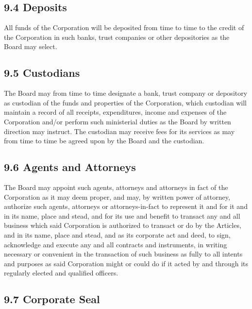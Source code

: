 \documentclass[
]{book}
\begin{document}
\subsection*{9.4 Deposits}\label{deposits}

All funds of the Corporation will be deposited from time to time to the credit of the Corporation in such banks, trust companies or other depositories as the Board may select.

\subsection*{9.5 Custodians}\label{custodians}

The Board may from time to time designate a bank, trust company or depository as custodian of the funds and properties of the Corporation, which custodian will maintain a record of all receipts, expenditures, income and expenses of the Corporation and/or perform such ministerial duties as the Board by written direction may instruct. The custodian may receive fees for its services as may from time to time be agreed upon by the Board and the custodian.

\subsection{9.6 Agents and Attorneys}\label{agents-and-attorneys}

The Board may appoint such agents, attorneys and attorneys in fact of the Corporation as it may deem proper, and may, by written power of attorney, authorize such agents, attorneys or attorneys-in-fact to represent it and for it and in its name, place and stead, and for its use and benefit to transact any and all business which said Corporation is authorized to transact or do by the Articles, and in its name, place and stead, and as its corporate act and deed, to sign, acknowledge and execute any and all contracts and instruments, in writing necessary or convenient in the transaction of such business as fully to all intents and purposes as said Corporation might or could do if it acted by and through its regularly elected and qualified officers.

\subsection*{9.7 Corporate Seal}\label{corporate-seal}
\end{document}
